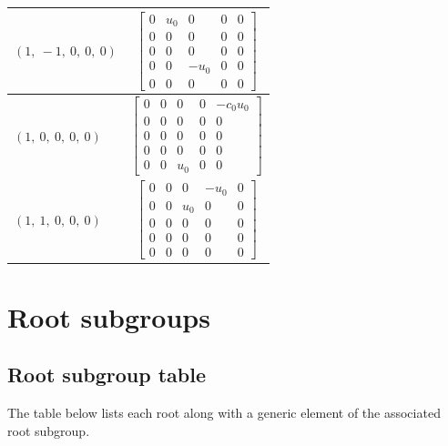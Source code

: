 \documentclass[11pt]{article}
\newcommand{\noi}{\noindent}
\theoremstyle{definition}
\begin{document}
\begin{tabular}{|l|c|}
    \hline
    $\left( 1, \  -1, \  0, \  0, \  0\right)$ & $\left[\begin{matrix}0 & u_{0} & 0 & 0 & 0\\0 & 0 & 0 & 0 & 0\\0 & 0 & 0 & 0 & 0\\0 & 0 & - u_{0} & 0 & 0\\0 & 0 & 0 & 0 & 0\end{matrix}\right]$ \\
    \hline
    $\left( 1, \  0, \  0, \  0, \  0\right)$ & $\left[\begin{matrix}0 & 0 & 0 & 0 & - c_{0} u_{0}\\0 & 0 & 0 & 0 & 0\\0 & 0 & 0 & 0 & 0\\0 & 0 & 0 & 0 & 0\\0 & 0 & u_{0} & 0 & 0\end{matrix}\right]$ \\
    \hline
    $\left( 1, \  1, \  0, \  0, \  0\right)$ & $\left[\begin{matrix}0 & 0 & 0 & - u_{0} & 0\\0 & 0 & u_{0} & 0 & 0\\0 & 0 & 0 & 0 & 0\\0 & 0 & 0 & 0 & 0\\0 & 0 & 0 & 0 & 0\end{matrix}\right]$ \\
    \hline
\end{tabular}


\newpage
\section{Root subgroups}

\subsection{Root subgroup table}

\noi The table below lists each root along with a generic element of the associated root subgroup.

\bigskip
\end{document}
